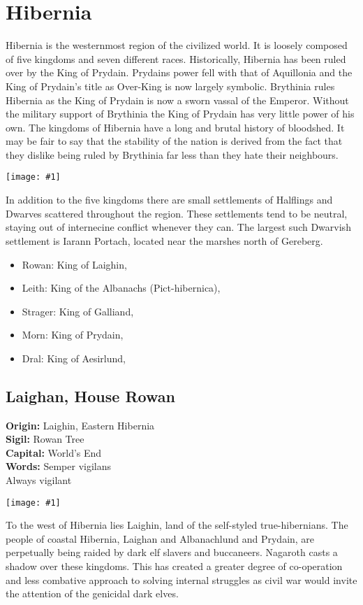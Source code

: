 \documentclass[a4paper]{dnd5}
\newcommand\inc[1]{
 \begin{center}\texttt{[image: \#1]}\end{center}
}
\newcommand\origin{\textbf{Origin: }}
\newcommand\sigil{\textbf{Sigil: }}
\newcommand\words{\textbf{Words: }}
\newcommand\wordsii{\hspace*{4em}}
\newcommand\capital{\textbf{Capital: }}
\begin{document}
\section*{Hibernia}

Hibernia is the westernmost region of the civilized world.  It is loosely composed of five kingdoms and seven different races. Historically, Hibernia has been ruled over by the King of Prydain.  Prydains power fell with that of Aquillonia and the King of Prydain's title as Over-King is now largely symbolic.  Brythinia rules Hibernia as the King of Prydain is now a sworn vassal of the Emperor.  Without the military support of Brythinia the King of Prydain has very little power of his own.  The kingdoms of Hibernia have a long and brutal history of bloodshed.  It may be fair to say that the stability of the nation is derived from the fact that they dislike being ruled by Brythinia far less than they hate their neighbours.  

\inc{hibernian_warrior.jpg}

In addition to the five kingdoms there are small settlements of Halflings and Dwarves scattered throughout the region.  These settlements tend to be neutral, staying out of internecine conflict whenever they can.  The largest such Dwarvish settlement is Iarann ​​Portach, located near the marshes north of Gereberg.   


\begin{itemize}
\item Rowan: King of Laighin,
\item Leith: King of the Albanachs (Pict-hibernica),
\item Strager: King of Galliand, 
\item Morn: King of Prydain,
\item Dral: King of Aesirlund,
\end{itemize}


\subsection{Laighan, House Rowan}
\origin Laighin, Eastern Hibernia\\
\sigil Rowan Tree\\
\capital World's End\\
\words Semper vigilans\\
\wordsii Always vigilant\\
\inc{rowan.png}

To the west of Hibernia lies Laighin, land of the self-styled true-hibernians.   The people of coastal Hibernia, Laighan and Albanachlund and Prydain, are perpetually being raided by dark elf slavers and buccaneers.  Nagaroth casts a shadow over these kingdoms.  This has created a greater degree of co-operation and less combative approach to solving internal struggles as civil war would invite the attention of the genicidal dark elves.  
\end{document}
